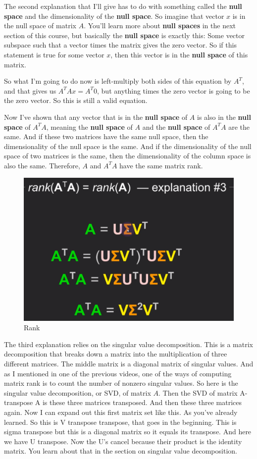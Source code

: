 \documentclass[fleqn,10pt]{olplainarticle}
\theoremstyle{definition}
\theoremstyle{remark}
\begin{document}
The second explanation that I'll give has to do with something called the \textbf{null space} and the dimensionality of the \textbf{null space}. So imagine that vector $x$ is in the null space of matrix $A$. You'll learn more about \textbf{null spaces} in the next section of this course, but basically the \textbf{null space} is exactly this: Some vector subspace such that a vector times the matrix gives the zero vector. So if this statement is true for some vector $x$, then this vector is in the \textbf{null space} of this matrix. 

So what I'm going to do now is left-multiply both sides of this equation by $A^T$, and that gives us $A^TAx = A^T0$, but anything times the zero vector is going to be the zero vector. So this is still a valid equation.

Now I've shown that any vector that is in the \textbf{null space} of $A$ is also in the \textbf{null space} of $A^TA$, meaning the \textbf{null space} of $A$ and the \textbf{null space} of $A^TA$ are the same. And if these two matrices have the same null space, then the dimensionality of the null space is the same. And if the dimensionality of the null space of two matrices is the same, then the dimensionality of the column space is also the same. Therefore, $A$ and $A^TA$ have the same matrix rank.

\begin{figure}[ht]
	\centering
	\includegraphics[width=0.5\linewidth]{images/rank-25.png}
	\caption{Rank}
	\label{fig:rank_25}
\end{figure}

The third explanation relies on the singular value decomposition. This is a matrix decomposition that breaks down a matrix into the multiplication of three different matrices. The middle matrix is a diagonal matrix of singular values. And as I mentioned in one of the previous videos, one of the ways of computing matrix rank is to count the number of nonzero singular values. So here is the singular value decomposition, or SVD, of matrix $A$. Then the SVD of matrix A-transpose A is these three matrices transposed. And then these three matrices again. Now I can expand out this first matrix set like this. As you've already learned. So this is V transpose transpose, that goes in the beginning. This is sigma transpose but this is a diagonal matrix so it equals its transpose. And here we have U transpose. Now the U's cancel because their product is the identity matrix. You learn about that in the section on singular value decomposition.
\end{document}
